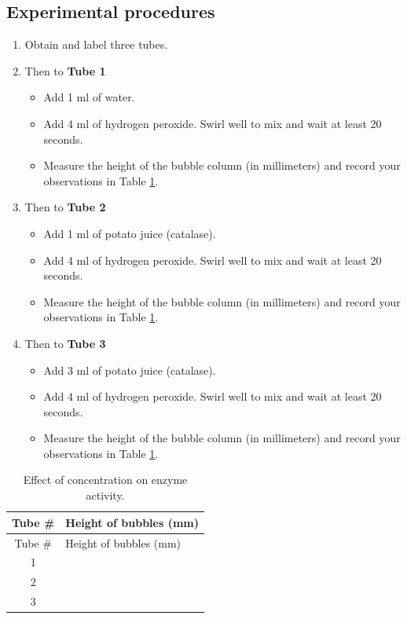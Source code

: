 \subsection{Experimental procedures}\label{experimental-procedures-19}

\begin{enumerate}
\def\labelenumi{\arabic{enumi}.}
\tightlist
\item
  Obtain and label three tubes.
\item
  Then to \textbf{Tube 1}

  \begin{itemize}
  \tightlist
  \item
    Add 1 ml of water.
  \item
    Add 4 ml of hydrogen peroxide. Swirl well to mix and wait at least
    20 seconds.
  \item
    Measure the height of the bubble column (in millimeters) and record
    your observations in Table \ref{tab:concentration}.
  \end{itemize}
\item
  Then to \textbf{Tube 2}

  \begin{itemize}
  \tightlist
  \item
    Add 1 ml of potato juice (catalase).
  \item
    Add 4 ml of hydrogen peroxide. Swirl well to mix and wait at least
    20 seconds.
  \item
    Measure the height of the bubble column (in millimeters) and record
    your observations in Table \ref{tab:concentration}.
  \end{itemize}
\item
  Then to \textbf{Tube 3}

  \begin{itemize}
  \tightlist
  \item
    Add 3 ml of potato juice (catalase).
  \item
    Add 4 ml of hydrogen peroxide. Swirl well to mix and wait at least
    20 seconds.
  \item
    Measure the height of the bubble column (in millimeters) and record
    your observations in Table \ref{tab:concentration}.
  \end{itemize}
\end{enumerate}

\begin{longtable}[]{@{}cl@{}}
\caption{\label{tab:concentration} Effect of concentration on enzyme
activity.}\tabularnewline
\toprule
Tube \# & Height of bubbles (mm)\tabularnewline
\midrule
\endfirsthead
\toprule
Tube \# & Height of bubbles (mm)\tabularnewline
\midrule
\endhead
1 &\tabularnewline
2 &\tabularnewline
3 &\tabularnewline
\bottomrule
\end{longtable}

